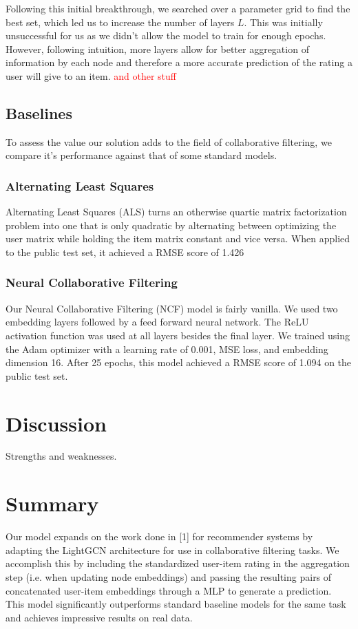 \documentclass[10pt,conference,compsocconf]{IEEEtran}
\begin{document}
Following this initial breakthrough, we searched over a parameter grid to find the best set, which led us to increase the number of layers $L$. This was initially unsuccessful for us as we didn't allow the model to train for enough epochs. However, following intuition, more layers allow for better aggregation of information by each node and therefore a more accurate prediction of the rating a user will give to an item. \textcolor{red}{and other stuff}

\subsection{Baselines}

To assess the value our solution adds to the field of collaborative filtering, we compare it's performance against that of some standard models.

\subsubsection{Alternating Least Squares}

Alternating Least Squares (ALS) turns an otherwise quartic matrix factorization problem into one that is only quadratic by alternating between optimizing the user matrix while holding the item matrix constant and vice versa. When applied to the public test set, it achieved a RMSE score of 1.426

\subsubsection{Neural Collaborative Filtering}

Our Neural Collaborative Filtering (NCF) model is fairly vanilla. We used two embedding layers followed by a feed forward neural network. The ReLU activation function was used at all layers besides the final layer. We trained using the Adam optimizer with a learning rate of 0.001, MSE loss, and embedding dimension 16. After 25 epochs, this model achieved a RMSE score of 1.094 on the public test set.

\section{Discussion}
\label{sec:tips-software}

Strengths and weaknesses. 


\section{Summary}

Our model expands on the work done in [1] for recommender systems by adapting the LightGCN architecture for use in collaborative filtering tasks. We accomplish this by including the standardized user-item rating in the aggregation step (i.e. when updating node embeddings) and passing the resulting pairs of concatenated user-item embeddings through a MLP to generate a prediction. This model significantly outperforms standard baseline models for the same task and achieves impressive results on real data.



\end{document}
